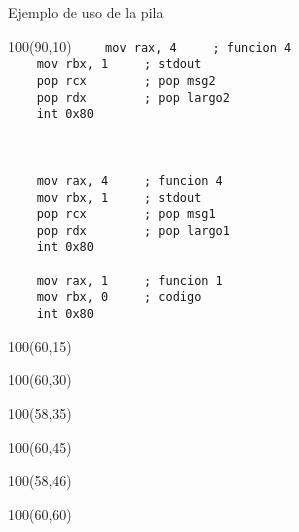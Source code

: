 \documentclass[aspectratio=169]{beamer}
\begin{document}
\begin{frame}[fragile]{Ejemplo de uso de la pila}
    \begin{textblock}{100}(90,10)
    \scriptsize
    \verb|    mov rax, 4     ; funcion 4  |\\
    \verb|    mov rbx, 1     ; stdout     |\\
    \verb|    pop rcx        ; pop msg2   |\\
    \verb|    pop rdx        ; pop largo2 |\\
    \verb|    int 0x80                    |\\
    \verb|                                |\\
    \verb|                                |\\
    \verb|                                |\\
    \verb|    mov rax, 4     ; funcion 4  |\\
    \verb|    mov rbx, 1     ; stdout     |\\
    \verb|    pop rcx        ; pop msg1   |\\
    \verb|    pop rdx        ; pop largo1 |\\
    \verb|    int 0x80                    |\\
    \verb|                                |\\
    \verb|    mov rax, 1     ; funcion 1  |\\
    \verb|    mov rbx, 0     ; codigo     |\\
    \verb|    int 0x80                    |\\
    \end{textblock}
    \begin{textblock}{100}(60,15)   \end{textblock}
    \begin{textblock}{100}(60,30)   \end{textblock}
    \begin{textblock}{100}(58,35)   \end{textblock}
    \begin{textblock}{100}(60,45)   \end{textblock}
    \begin{textblock}{100}(58,46)   \end{textblock}
    \begin{textblock}{100}(60,60)   \end{textblock}

\end{frame}
\end{document}
